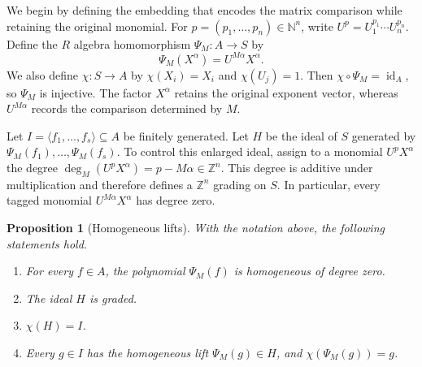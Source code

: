 \documentclass[preprint,12pt,3p]{elsarticle}
\newtheorem{proposition}[theorem]{Proposition}
\theoremstyle{definition}
\theoremstyle{remark}
\begin{document}
	We begin by defining the embedding that encodes the matrix comparison
	while retaining the original monomial. For
	$p=(p_1,\ldots,p_n)\in\mathbb N^n$, write
	$U^p=U_1^{p_1}\cdots U_n^{p_n}$. Define the $R$ algebra homomorphism
	$\Psi_M\colon A\to S$ by
	\begin{equation}
		\label{eq:tagged-embedding}
		\Psi_M(X^\alpha)= U^{M\alpha}X^\alpha.
	\end{equation}
	We also define $\chi\colon S\to A$ by
	$\chi(X_i)=X_i$ and $\chi(U_j)=1$. Then
	$\chi\circ\Psi_M=\operatorname{id}_A$, so $\Psi_M$ is
	injective. The factor $X^\alpha$ retains the original exponent vector,
	whereas $U^{M\alpha}$ records the comparison determined by $M$.
	
%	
%	
	
	Let $I=\langle f_1,\ldots,f_s\rangle\subseteq A$ be finitely
	generated. Let $H$ be the ideal of $S$ generated by
	$\Psi_M(f_1),\ldots,\Psi_M(f_s)$. To control this enlarged ideal,
	assign to a monomial $ U^pX^\alpha$ the degree
	$\deg_M( U^pX^\alpha)=p-M\alpha\in\mathbb Z^n$. This degree is
	additive under multiplication and therefore defines a $\mathbb Z^n$
	grading on $S$. In particular, every tagged monomial
	$ U^{M\alpha}X^\alpha$ has degree zero.
	
	\begin{proposition}[Homogeneous lifts]
		\label{prop:homogeneous-lifts}
		With the notation above, the following statements hold.
		\begin{enumerate}
			\item For every $f\in A$, the polynomial $\Psi_M(f)$ is homogeneous
			of degree zero.
			\item The ideal $H$ is graded.
			\item $\chi(H)=I$.
			\item Every $g\in I$ has the homogeneous lift $\Psi_M(g)\in H$, and
			$\chi(\Psi_M(g))=g$.
		\end{enumerate}
	\end{proposition}
	
\end{document}
